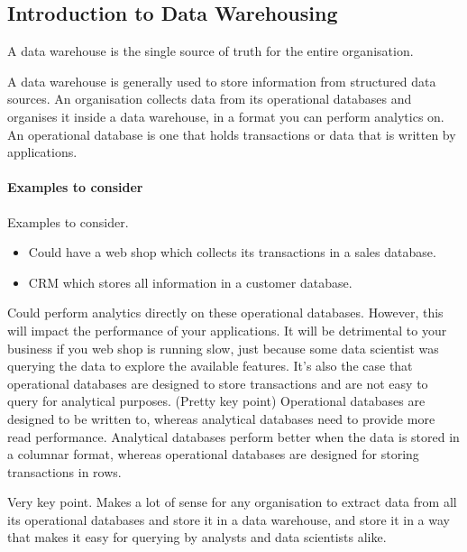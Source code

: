 
\subsection{Introduction to Data Warehousing}

\begin{note}
    A data warehouse is the single source of truth for the entire organisation.
\end{note}

A data warehouse is generally used to store information from structured data sources.
An organisation collects data from its operational databases and organises it inside a data warehouse, in a format you can perform analytics on.
An operational database is one that holds transactions or data that is written by applications.

\paragraph{Examples to consider}
Examples to consider.
\begin{itemize}
    \item Could have a web shop which collects its transactions in a sales database.
    \item CRM which stores all information in a customer database.
\end{itemize}

Could perform analytics directly on these operational databases.
However, this will impact the performance of your applications.
It will be detrimental to your business if you web shop is running slow, just because some data scientist was querying the data to explore the available features.
It's also the case that operational databases are designed to store transactions and are not easy to query for analytical purposes. (Pretty key point)
Operational databases are designed to be written to, whereas analytical databases need to provide more read performance.
Analytical databases perform better when the data is stored in a columnar format, whereas operational databases are designed for storing transactions in rows.

\begin{note}
    Very key point.
    Makes a lot of sense for any organisation to extract data from all its operational databases and store it in a data warehouse,
    and store it in a way that makes it easy for querying by analysts and data scientists alike.
\end{note}


